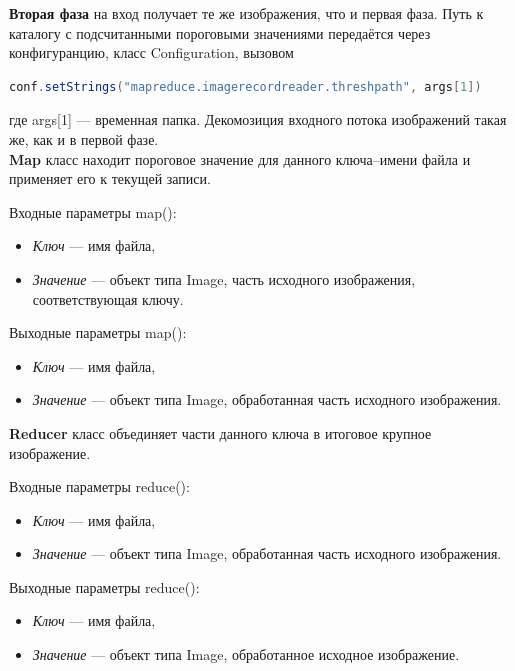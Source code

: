 \documentclass[12pt,a4paper]{extarticle} %
\begin{document}
 \textbf{Вторая фаза} на вход получает те же изображения, что и первая фаза. Путь к каталогу с подсчитанными пороговыми значениями передаётся через конфигуранцию, класс Configuration, вызовом
 \begin{lstlisting}[language=Java]
    conf.setStrings("mapreduce.imagerecordreader.threshpath", args[1]) 
\end{lstlisting}
где args[1] --- временная папка. Декомозиция входного потока изображений такая же, как и в первой фазе.\\[5pt]

    \noindent \textbf{Map} класс находит пороговое значение для данного ключа--имени файла и применяет его к текущей записи.

    \noindent Входные параметры map():
    \begin{itemize}
        \item[] \textit{Ключ} --- имя файла,
        \item[] \textit{Значение} --- объект типа Image, часть исходного изображения, соответствующая ключу.
    \end{itemize}

    \noindent Выходные параметры map():
    \begin{itemize}
        \item[] \textit{Ключ} --- имя файла,
        \item[] \textit{Значение} --- объект типа Image, обработанная часть исходного изображения.
    \end{itemize}

    \noindent \textbf{Reducer} класс объединяет части  данного ключа в итоговое крупное изображение. 

    \noindent Входные параметры reduce():
    \begin{itemize}
        \item[] \textit{Ключ} --- имя файла,
        \item[] \textit{Значение} --- объект типа Image, обработанная часть исходного изображения.
    \end{itemize}

    \noindent Выходные параметры reduce():
    \begin{itemize}
        \item[] \textit{Ключ} --- имя файла,
        \item[] \textit{Значение} --- объект типа Image, обработанное исходное изображение.
    \end{itemize}

    
\end{document}
